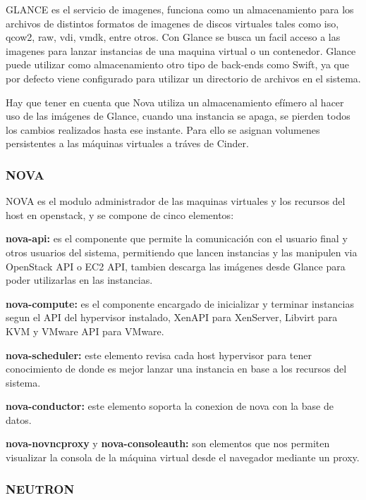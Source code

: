     GLANCE es el servicio de imagenes, funciona como un almacenamiento para los archivos de distintos formatos de imagenes de discos virtuales tales como iso, qcow2, raw, vdi, vmdk, entre otros. Con Glance se busca un facil acceso a las imagenes para lanzar instancias de una maquina virtual o un contenedor. Glance puede utilizar como almacenamiento otro tipo de back-ends como Swift, ya que por defecto viene configurado para utilizar un directorio de archivos en el sistema.
    
    Hay que tener en cuenta que Nova utiliza un almacenamiento efímero al hacer uso de las imágenes de Glance, cuando una instancia se apaga, se pierden todos los cambios realizados hasta ese instante. Para ello se asignan volumenes persistentes a las máquinas virtuales a tráves de Cinder.
    
    \subsubsection{NOVA}
    
    NOVA es el modulo administrador de las maquinas virtuales y los recursos del host en openstack, y se compone de cinco elementos:
    
    \textbf{nova-api:} es el componente que permite la comunicación con el usuario final y otros usuarios del sistema, permitiendo que lancen instancias y las manipulen via OpenStack API o EC2 API, tambien descarga las imágenes desde Glance para poder utilizarlas en las instancias.
    
    \textbf{nova-compute:} es el componente encargado de inicializar y terminar instancias segun el API del hypervisor instalado, XenAPI para XenServer, Libvirt para KVM y VMware API para VMware.
   
    \textbf{nova-scheduler:} este elemento revisa cada host hypervisor para tener conocimiento de donde es mejor lanzar una instancia en base a los recursos del sistema.
    
    \textbf{nova-conductor:} este elemento soporta la conexion de nova con la base de datos.
    
    \textbf{nova-novncproxy} y \textbf{nova-consoleauth:} son elementos que nos permiten visualizar la consola de la máquina virtual desde el navegador mediante un proxy.
    
    \subsubsection{NEUTRON}
    
